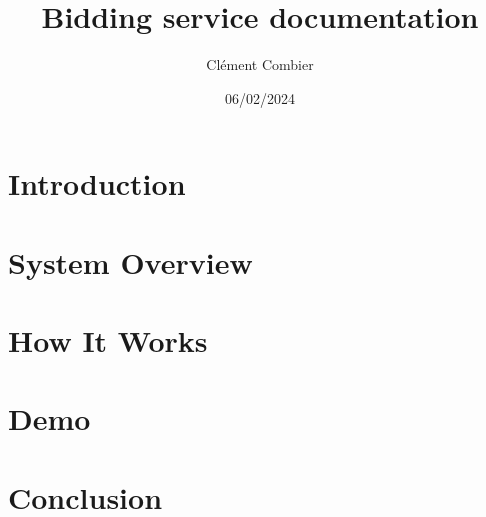 \documentclass[12pt]{article}
\title{\esbay Bidding service documentation}
\author{Clément Combier}
\date{06/02/2024}
\begin{document}
\maketitle

\section{Introduction}

\section{System Overview}

\section{How It Works}

\section{Demo}

\section{Conclusion}

% 
% 
\end{document}
